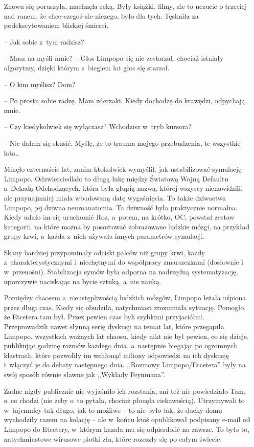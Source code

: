 \documentclass[oneside,polish,11pt,sfheadings]{mwbk}
\begin{document}
Znowu się poruszyła, machnęła ręką. Były książki, filmy, ale to uczucie
o trzeciej nad ranem, że chce-czegoś-ale-niczego, było dla tych.
Tęskniła za podekscytowaniem bliskiej śmierci.

-- Jak sobie z~tym radzisz?

-- Masz na myśli mnie? -- Głos Limpopo się nie zestarzał, chociaż istniały
algorytmy, dzięki którym z~biegiem lat głos się starzał.

-- O kim myślisz? Dom?

-- Po prostu sobie radzę. Mam zderzaki. Kiedy dochodzę do krawędzi,
odpychają mnie.

-- Czy kiedykolwiek się wyłączasz? Wchodzisz w~tryb kursora?

-- Nie dałam się skusić. Myślę, że to trauma mojego przebudzenia, te
wszystkie lata\ldots 

Minęło czternaście lat, zanim ktokolwiek wymyślił, jak ustabilizować
symulację Limpopo. Odzwierciedlało to długą lukę między Światową Wojną
Defaultu a~Dekadą Odchodzących, która była głupią nazwą, której wszyscy
nienawidzili, ale przynajmniej miała wbudowaną datę wygaśnięcia. To
także dziwactwa Limpopo, jej dziwna neuroanatomia. Ta dziwność była
praktycznie normalna. Kiedy udało im się uruchomić Roz, a~potem, na
krótko, OC, powstał zestaw kategorii, na które można by posortować
zobrazowane ludzkie mózgi, na przykład grupy krwi, a~każda z~nich
używała innych parametrów symulacji.

Skany bardziej przypominały odciski palców niż grupy krwi, każdy z~charakterystycznymi i~niechętnymi do współpracy zmarszczkami (dosłownie
i w~przenośni). Stabilizacja symów była odporna na nadrzędną
systematyzację, uporczywie naciskając na bycie sztuką, a~nie nauką.

Pomiędzy chaosem a~nieustępliwością ludzkich mózgów, Limpopo leżała
uśpiona przez długi czas. Kiedy się obudziła, natychmiast zrozumiała
sytuację. Pomogło, że Etcetera tam był. Przez pewien czas byli szybkimi
przyjaciółmi. Przeprowadzili nawet słynną serię dyskusji na temat lat,
które przegapiła Limpopo, wszystkich ważnych lat chaosu, kiedy nikt nie
był pewien, co się dzieje, publikując godzinę rozmów każdego dnia, a~następnie biegając po ogromnych klastrach, które pozwoliły im wchłonąć
miliony odpowiedzi na ich dyskusję i~włączyć je do debaty następnego
dnia. ,,Rozmowy Limpopo/Etcetera'' były na swój sposób równie sławne jak
,,Wykłady Feynmana''.

Żadne nigdy publicznie nie wyjaśniło ich rozstania,  ani też nie
powiedziało Tam, o~co chodzi (nie żeby o~to pytała, chociaż płonęła
ciekawością). Utrzymywali to w~tajemnicy tak długo, jak to możliwe -- to
nie było tak, że duchy domu wychodziły razem na kolację -- ale w~końcu
ktoś opublikował podpisany e-mail od Limpopo do Etcetery, w~którym
kazała mu się odpierdolić na zawsze. To było to, natychmiastowe wirusowe
plotki zła, które rozeszły się po całym świecie.
\end{document}
